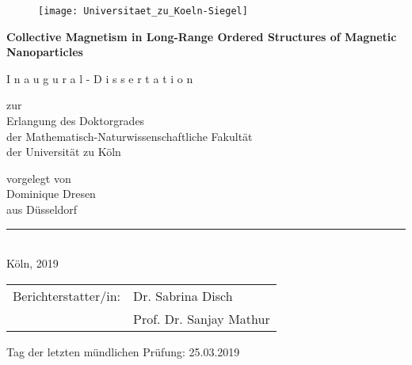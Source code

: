 \begin{titlepage}
  \begin{center}
    \begin{figure}[H]
      \centering
      \texttt{[image: Universitaet\_zu\_Koeln-Siegel]}
    \end{figure}
    \LARGE\textbf{Collective Magnetism in Long-Range Ordered Structures of Magnetic Nanoparticles}

    \vspace{2cm}

    \Large{I n a u g u r a l - D i s s e r t a t i o n } \\

    \vspace{2cm}

    \large{zur}\\
    \large{Erlangung des Doktorgrades}\\
    \large{der Mathematisch-Naturwissenschaftliche Fakult\"at}\\
    \large der Universit\"at zu K\"oln\\

    \vspace{2cm}

    \large{vorgelegt von}\\
    \large{Dominique Dresen}\\
    \large{aus D\"usseldorf}\\

    \vspace{2cm}

    \noindent\rule{14cm}{0.4pt}\\
    \normalsize{Köln, 2019}\\
  \end{center}
\end{titlepage}

\cleardoublepage


\vspace*{\fill}

\begin{tabular}{@{}ll}
  Berichterstatter/in: & Dr. Sabrina Disch \\
                       & Prof. Dr. Sanjay Mathur
\end{tabular}

\medskip
\vspace{1cm}

Tag der letzten mündlichen Prüfung: 25.03.2019


